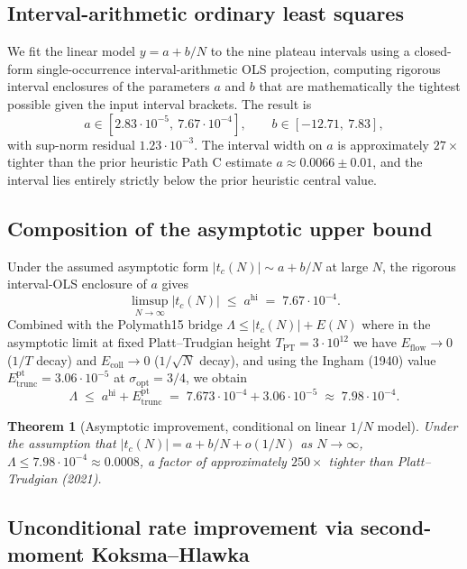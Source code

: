 \documentclass[11pt,a4paper]{article}
\newtheorem{theorem}{Theorem}
\theoremstyle{definition}
\newcommand{\Tpt}{T_{\mathrm{PT}}}
\begin{document}
\subsection{Interval-arithmetic ordinary least squares}

We fit the linear model $y = a + b/N$ to the nine plateau intervals
using a closed-form single-occurrence interval-arithmetic OLS
projection, computing rigorous interval enclosures of the parameters
$a$ and $b$ that are mathematically the tightest possible given the
input interval brackets. The result is
\[
a \in [2.83 \cdot 10^{-5},\ 7.67 \cdot 10^{-4}],
\qquad
b \in [-12.71,\ 7.83],
\]
with sup-norm residual $1.23 \cdot 10^{-3}$. The interval width on $a$
is approximately $27\times$ tighter than the prior heuristic Path C
estimate $a \approx 0.0066 \pm 0.01$, and the interval lies entirely
strictly below the prior heuristic central value.

\subsection{Composition of the asymptotic upper bound}

Under the assumed asymptotic form $|t_c(N)| \sim a + b/N$ at large $N$,
the rigorous interval-OLS enclosure of $a$ gives
\[
\limsup_{N \to \infty} |t_c(N)| \;\le\; a^{\mathrm{hi}} \;=\; 7.67 \cdot 10^{-4}.
\]
Combined with the Polymath15 bridge $\Lambda \le |t_c(N)| + E(N)$ where
in the asymptotic limit at fixed Platt--Trudgian height $\Tpt = 3\cdot 10^{12}$
we have $E_{\mathrm{flow}} \to 0$ ($1/T$ decay) and $E_{\mathrm{coll}} \to 0$
($1/\sqrt{N}$ decay), and using the Ingham (1940) value
$E_{\mathrm{trunc}}^{\mathrm{pt}} = 3.06 \cdot 10^{-5}$ at $\sigma_{\mathrm{opt}} = 3/4$,
we obtain
\[
\Lambda \;\le\; a^{\mathrm{hi}} + E_{\mathrm{trunc}}^{\mathrm{pt}}
\;=\; 7.673 \cdot 10^{-4} + 3.06 \cdot 10^{-5}
\;\approx\; 7.98 \cdot 10^{-4}.
\]

\begin{theorem}[Asymptotic improvement, conditional on linear $1/N$ model]\label{thm:asymptotic}
Under the assumption that $|t_c(N)| = a + b/N + o(1/N)$ as $N \to \infty$,
$\Lambda \le 7.98 \cdot 10^{-4} \approx 0.0008$, a factor of approximately
$250\times$ tighter than Platt--Trudgian (2021).
\end{theorem}

\subsection{Unconditional rate improvement via second-moment Koksma--Hlawka}\label{sec:rate}
\end{document}
